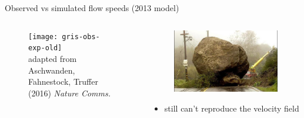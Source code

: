 \documentclass[hide notes,intlimits]{beamer}
\begin{document}
\begin{frame}{Observed vs simulated flow speeds (2013 model)}
  \begin{columns}[c]
    \begin{column}{.6\linewidth}
    \begin{figure}
      \texttt{[image: gris-obs-exp-old]}
      \\ \tiny{adapted from Aschwanden, Fahnestock, Truffer (2016) \textit{Nature Comms.}}
    \end{figure}
    \end{column}
    \begin{column}{.4\linewidth}
      \begin{figure}
        \includegraphics[width=\textwidth]{roadblocks}
      \end{figure}
      \begin{itemize}
      \item still can't reproduce the velocity field
      \end{itemize}
    \end{column}
  \end{columns}
  \note[item]{}
\end{frame}
\end{document}
